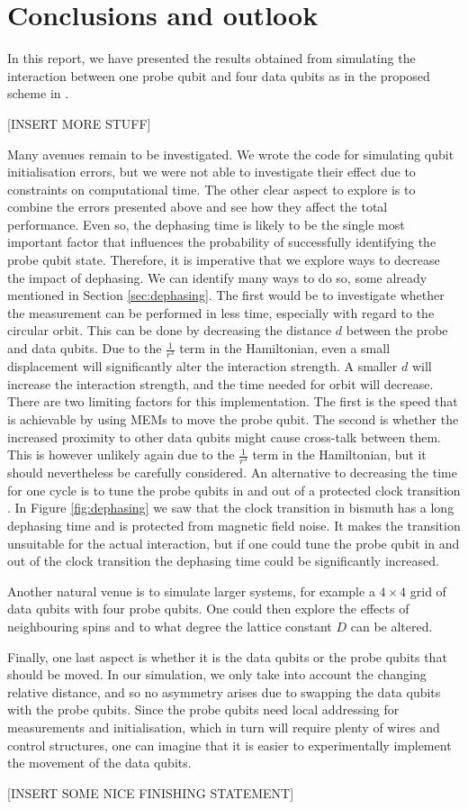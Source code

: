 
\section{Conclusions and outlook } \label{sec:conclusions}
In this report, we have presented the results obtained from simulating the interaction between one probe qubit and four data qubits as in the proposed scheme in \cite{the paper}. 

[INSERT MORE STUFF]


Many avenues remain to be investigated. We wrote the code for simulating qubit initialisation errors, but we were not able to investigate their effect due to constraints on computational time. The other clear aspect to explore is to combine the errors presented above and see how they affect the total performance. Even so, the dephasing time is likely to be the single most important factor that influences the probability of successfully identifying the probe qubit state. Therefore, it is imperative that we explore ways to decrease the impact of dephasing. We can identify many ways to do so, some already mentioned in Section \ref{sec:dephasing}. The first would be to investigate whether the measurement can be performed in less time, especially with regard to the circular orbit. This can be done by decreasing the distance $d$ between the probe and data qubits. Due to the $\frac{1}{r^3}$ term in the Hamiltonian, even a small displacement will significantly alter the interaction strength. A smaller $d$ will increase the interaction strength, and the time needed for orbit will decrease. There are two limiting factors for this implementation. The first is the speed that is achievable by using MEMs to move the probe qubit. The second is whether the increased proximity to other data qubits might cause cross-talk between them. This is however unlikely again due to the $\frac{1}{r^3}$ term in the Hamiltonian, but it should nevertheless be carefully considered. An alternative to decreasing the time for one cycle is to tune the probe qubits in and out of a protected clock transition \cite{something}. In Figure \ref{fig:dephasing} we saw that the clock transition in bismuth has a long dephasing time and is protected from magnetic field noise. It makes the transition unsuitable for the actual interaction, but if one could tune the probe qubit in and out of the clock transition the dephasing time could be significantly increased. 

Another natural venue is to simulate larger systems, for example a $4\times 4$ grid of data qubits with four probe qubits. One could then explore the effects of neighbouring spins and to what degree the lattice constant $D$ can be altered. 

Finally, one last aspect is whether it is the data qubits or the probe qubits that should be moved. In our simulation, we only take into account the changing relative distance, and so no asymmetry arises due to swapping the data qubits with the probe qubits. Since the probe qubits need local addressing for measurements and initialisation, which in turn will require plenty of wires and control structures, one can imagine that it is easier to experimentally implement the movement of the data qubits. 

[INSERT SOME NICE FINISHING STATEMENT]